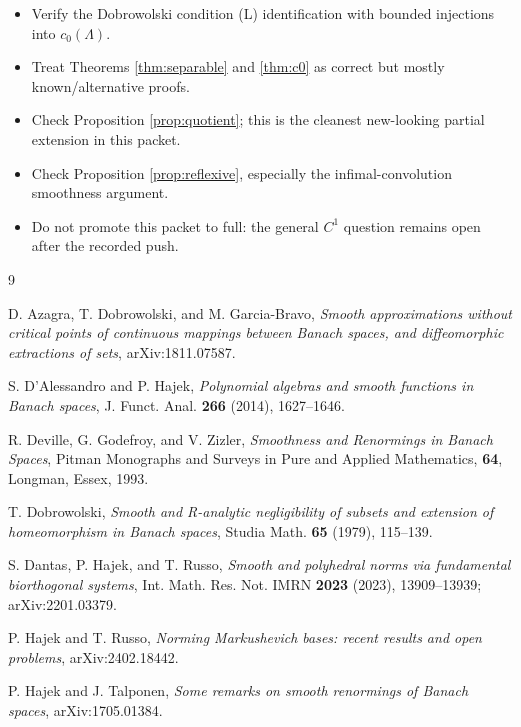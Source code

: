 \documentclass[11pt]{article}
\theoremstyle{remark}
\begin{document}
\begin{itemize}
\item Verify the Dobrowolski condition (L) identification with bounded
injections into \(c_0(\Lambda)\).
\item Treat Theorems \ref{thm:separable} and \ref{thm:c0} as correct but
mostly known/alternative proofs.
\item Check Proposition \ref{prop:quotient}; this is the cleanest new-looking
partial extension in this packet.
\item Check Proposition \ref{prop:reflexive}, especially the
infimal-convolution smoothness argument.
\item Do not promote this packet to full: the general \(C^1\) question remains
open after the recorded push.
\end{itemize}

\begin{thebibliography}{9}

D. Azagra, T. Dobrowolski, and M. Garcia-Bravo,
\emph{Smooth approximations without critical points of continuous mappings
between Banach spaces, and diffeomorphic extractions of sets},
arXiv:1811.07587.

S. D'Alessandro and P. Hajek,
\emph{Polynomial algebras and smooth functions in Banach spaces},
J. Funct. Anal. \textbf{266} (2014), 1627--1646.

R. Deville, G. Godefroy, and V. Zizler,
\emph{Smoothness and Renormings in Banach Spaces},
Pitman Monographs and Surveys in Pure and Applied Mathematics, \textbf{64},
Longman, Essex, 1993.

T. Dobrowolski,
\emph{Smooth and R-analytic negligibility of subsets and extension of
homeomorphism in Banach spaces},
Studia Math. \textbf{65} (1979), 115--139.

S. Dantas, P. Hajek, and T. Russo,
\emph{Smooth and polyhedral norms via fundamental biorthogonal systems},
Int. Math. Res. Not. IMRN \textbf{2023} (2023), 13909--13939;
arXiv:2201.03379.

P. Hajek and T. Russo,
\emph{Norming Markushevich bases: recent results and open problems},
arXiv:2402.18442.

P. Hajek and J. Talponen,
\emph{Some remarks on smooth renormings of Banach spaces},
arXiv:1705.01384.

\end{thebibliography}
\end{document}
